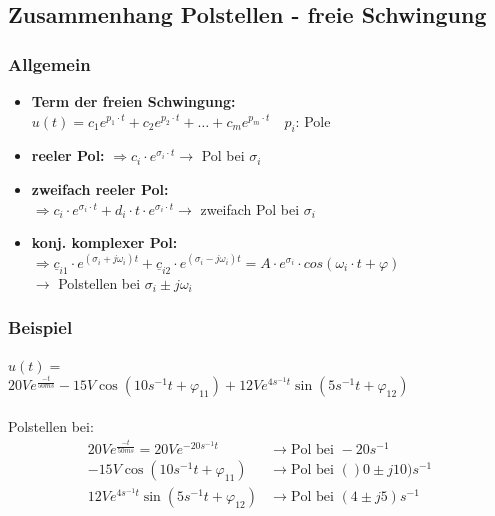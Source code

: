 \subsection{Zusammenhang Polstellen - freie Schwingung}
\begin{multicols}{2}
\subsubsection{Allgemein}
\begin{itemize}
	\item \textbf{Term der freien Schwingung:}\\
		  $u(t)=c_1 e^{p_1 \cdot t}+c_2 e^{p_2\cdot t}+\ldots+c_m e^{p_m \cdot t}\quad
		  p_i$: Pole		
	 	\item \textbf{reeler Pol:} $\Rightarrow c_i\cdot 	e^{\sigma_i\cdot t} \rightarrow$ Pol bei $\sigma_i$
		\item \textbf{zweifach reeler Pol:}\\ $\Rightarrow c_i\cdot e^{\sigma_i\cdot t} + d_i \cdot t \cdot e^{\sigma_i\cdot t} \rightarrow$ zweifach Pol bei $\sigma_i$
		\item \textbf{konj. komplexer Pol:}\\
		$\Rightarrow \underline{c}_{i1}\cdot e^{(\sigma_i+j\omega_i)t} + \underline{c}_{i2}\cdot e^{(\sigma_i-j\omega_i)t} = A \cdot e^{\sigma_i}\cdot cos(\omega_i\cdot t + \varphi)$ \\$\rightarrow$ Polstellen bei $\sigma_i \pm j\omega_i$
		
\end{itemize}

\subsubsection{Beispiel}
$u(t)=$\\$20Ve^{\frac{-t}{50ms}}-15V\cos(10s^{-1}t+\varphi_{11})+12Ve^{4s^{-1}t}\sin(5s^{-1}t+\varphi_{12})$\\ \\
Polstellen bei:
\begin{align}
	20Ve^{\frac{-t}{50ms}} = 20Ve^{-20s^{-1}t} &\rightarrow \text{Pol bei }
	-20s^{-1}\nonumber\\
	-15V\cos(10s^{-1}t+\varphi_{11}) &\rightarrow \text{Pol bei }
	()0\pm j10)s^{-1}\nonumber\\
	12Ve^{4s^{-1}t}\sin(5s^{-1}t+\varphi_{12}) &\rightarrow \text{Pol bei } (4\pm
	j5)s^{-1}\nonumber
\end{align}

\end{multicols}



